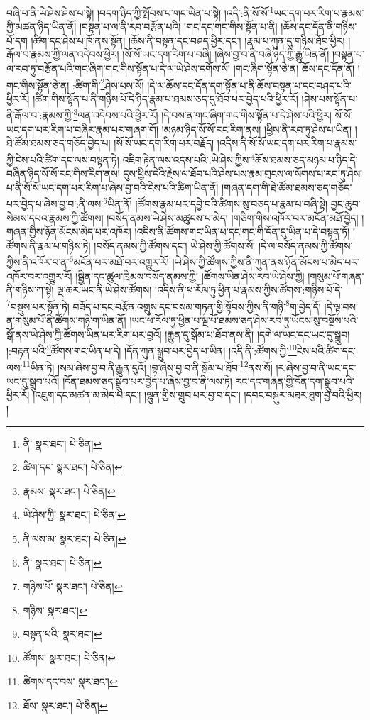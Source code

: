 བཞི་པ་ནི་ཡེ་ཤེས་ཤེས་པ་སྟེ། །བདག་ཉིད་ཀྱི་སྤོབས་པ་གང་ཡིན་པ་སྟེ། །འདི་:ནི་སོ་སོ་\footnote{ནི་  སྣར་ཐང་།  པེ་ཅིན། }ཡང་དག་པར་རིག་པ་རྣམས་ཀྱི་མཚན་ཉིད་ཡིན་ནོ། །བསྟན་པ་ལ་ནི་རབ་བརྩོན་པའི། །གང་དང་གང་གིས་སྟོན་པ་ནི། །ཆོས་དང་དོན་ནི་གཉིས་པོ་དག །ཚིག་དང་ཤེས་པ་ཁོ་ནས་སྟོན། །ཆོས་ནི་བསྟན་དང་བཤད་ཕྱིར་དང་། །རྣམ་པ་ཀུན་དུ་གཉིས་ཐོབ་ཕྱིར། །རྒོལ་བ་རྣམས་ཀྱི་ལན་འདེབས་ཕྱིར། །སོ་སོ་ཡང་དག་རིག་པ་བཞི། །ཞེས་བྱ་བ་ནི་བཞི་ཉིད་ཀྱི་རྒྱུ་ཡིན་ནོ། །བསྟན་པ་ལ་རབ་ཏུ་བརྩོན་པའི་གང་ཞིག་གང་གིས་སྟོན་པ་དེ་ལ་ཡེ་ཤེས་དགོས་སོ། །གང་ཞིག་སྟོན་ཅེ་ན། ཆོས་དང་དོན་ནོ། །གང་གིས་སྟོན་ཅེ་ན། :ཚིག་གི་\footnote{ཚིག་དང་  སྣར་ཐང་།  པེ་ཅིན། }ཤེས་པས་སོ། །དེ་ལ་ཆོས་དང་དོན་དག་སྟོན་པ་ནི་ཆོས་བསྟན་པ་དང་བཤད་པའི་ཕྱིར་རོ། །ཚིག་གིས་སྟོན་པ་ནི་གཉིས་པོ་དེ་ཉིད་རྣམ་པ་ཐམས་ཅད་དུ་ཐོབ་པར་བྱེད་པའི་ཕྱིར་རོ། །ཤེས་པས་སྟོན་པ་ནི་རྒོལ་བ་:རྣམས་ཀྱི་\footnote{རྣམས་  སྣར་ཐང་།  པེ་ཅིན། }ལན་འདེབས་པའི་ཕྱིར་རོ། །དེ་བས་ན་གང་ཞིག་གང་གིས་སྟོན་པ་དེ་ཤེས་པའི་ཕྱིར། སོ་སོ་ཡང་དག་པར་རིག་པ་བཞིར་རྣམ་པར་གཞག་གོ། །མཉམ་ཉིད་སོ་སོ་རང་རིག་ནས། །ཕྱིས་ནི་རབ་ཏུ་ཤེས་པ་ཡིན། །ཐེ་ཚོམ་ཐམས་ཅད་གཅོད་བྱེད་པ། །སོ་སོ་ཡང་དག་རིག་པར་བརྗོད། །འདིས་ནི་སོ་སོ་ཡང་དག་པར་རིག་པ་རྣམས་ཀྱི་ངེས་པའི་ཚིག་དང་ལས་བསྟན་ཏེ། འཇིག་རྟེན་ལས་འདས་པའི་:ཡེ་ཤེས་ཀྱིས་\footnote{ཡེ་ཤེས་ཀྱི་  སྣར་ཐང་།  པེ་ཅིན། }ཆོས་ཐམས་ཅད་མཉམ་པ་ཉིད་དེ་བཞིན་ཉིད་སོ་སོ་རང་གིས་རིག་ནས། དུས་ཕྱིས་དེའི་རྗེས་ལ་ཐོབ་པའི་ཤེས་པས་རྣམ་གྲངས་ལ་སོགས་པ་རབ་ཏུ་ཤེས་པ་ནི་སོ་སོ་ཡང་དག་པར་རིག་པ་ཞེས་བྱ་བའི་ངེས་པའི་ཚིག་ཡིན་ནོ། །གཞན་དག་གི་ཐེ་ཚོམ་ཐམས་ཅད་གཅོད་པར་བྱེད་པ་ཞེས་བྱ་བ་:ནི་ལས་\footnote{ནི་ལས་མ་  སྣར་ཐང་།  པེ་ཅིན། }ཡིན་ནོ། །ཚོགས་རྣམ་པར་དབྱེ་བའི་ཚིགས་སུ་བཅད་པ་རྣམ་པ་བཞི་སྟེ། བྱང་ཆུབ་སེམས་དཔའ་རྣམས་ཀྱི་ཚོགས། །བསོད་ནམས་ཡེ་ཤེས་མཚུངས་པ་མེད། །གཅིག་གིས་འཁོར་བར་མངོན་མཐོ་བྱེད། །གཞན་གྱིས་ཉོན་མོངས་མེད་པར་འཁོར། །འདིས་ནི་ཚོགས་གང་ཡིན་པ་དང་གང་གི་དོན་དུ་ཡིན་པ་དེ་བསྟན་ཏོ། །ཚོགས་ནི་རྣམ་པ་གཉིས་ཏེ། །བསོད་ནམས་ཀྱི་ཚོགས་དང་། ཡེ་ཤེས་ཀྱི་ཚོགས་སོ། །དེ་ལ་བསོད་ནམས་ཀྱི་ཚོགས་ཀྱིས་ནི་འཁོར་བ་ན་\footnote{ནི་  སྣར་ཐང་།  པེ་ཅིན། }མངོན་པར་མཐོ་བར་འགྱུར་རོ། །ཡེ་ཤེས་ཀྱི་ཚོགས་ཀྱིས་ནི་ཀུན་ནས་ཉོན་མོངས་པ་མེད་པར་འཁོར་བར་འགྱུར་རོ། །སྦྱིན་དང་ཚུལ་ཁྲིམས་བསོད་ནམས་ཀྱི། །ཚོགས་ཡིན་ཤེས་རབ་ཡེ་ཤེས་ཀྱི། །གསུམ་པོ་གཞན་ནི་གཉིས་ཀ་སྟེ། ལྔ་ཆར་ཡང་ནི་ཡེ་ཤེས་ཚོགས། །འདིས་ནི་ཕ་རོལ་ཏུ་ཕྱིན་པ་རྣམས་ཀྱིས་ཚོགས་:གཉིས་པོ་དེ་\footnote{གཉིས་པོ་  སྣར་ཐང་།  པེ་ཅིན། }བསྡུས་པར་སྟོན་ཏེ། བཟོད་པ་དང་བརྩོན་འགྲུས་དང་བསམ་གཏན་གྱི་སྟོབས་ཀྱིས་ནི་གཉི་\footnote{གཉིས་  སྣར་ཐང་། }ག་བྱེད་དོ། །དེ་ལྟ་བས་ན་གསུམ་པོ་ནི་ཚོགས་གཉི་ག་ཡིན་ནོ། །ཡང་ཕ་རོལ་ཏུ་ཕྱིན་པ་ལྔ་པོ་ཐམས་ཅད་ཤེས་རབ་ཏུ་ཡོངས་སུ་བསྔོས་པའི་སྒོ་ནས་ཡེ་ཤེས་ཀྱི་ཚོགས་ཡིན་པར་རིག་པར་བྱའོ། །རྒྱུན་དུ་སྒོམ་པ་ཐོབ་ནས་ནི། །དགེ་ལ་ཡང་དང་ཡང་དུ་སྒྲུབ། །:བརྟན་པའི་\footnote{བསྟན་པའི་  སྣར་ཐང་། }ཚོགས་གང་ཡིན་པ་དེ། །དོན་ཀུན་སྒྲུབ་པར་བྱེད་པ་ཡིན། །འདི་ནི་:ཚོགས་ཀྱི་\footnote{ཚོགས་  སྣར་ཐང་།  པེ་ཅིན། }ངེས་པའི་ཚིག་དང་ལས་\footnote{ཚིགས་དང་བས་  སྣར་ཐང་། }ཡིན་ཏེ། །སམ་ཞེས་བྱ་བ་ནི་རྒྱུན་དུའོ། །བྷ་ཞེས་བྱ་བ་ནི་སྒོམ་པ་ཐོབ་\footnote{ཐོས་  སྣར་ཐང་།  པེ་ཅིན། }ནས་སོ། །ར་ཞེས་བྱ་བ་ནི་ཡང་དང་ཡང་དུ་སྒྲུབ་པའོ། །དོན་ཐམས་ཅད་སྒྲུབ་པར་བྱེད་པ་ཞེས་བྱ་བ་ནི་ལས་ཏེ། རང་དང་གཞན་གྱི་དོན་དག་སྒྲུབ་པའི་ཕྱིར་རོ། །འཇུག་དང་མཚན་མ་མེད་པ་དང་། །ལྷུན་གྱིས་གྲུབ་པར་བྱ་བ་དང་། །དབང་བསྐུར་མཐར་ཐུག་བྱ་བའི་ཕྱིར། །
